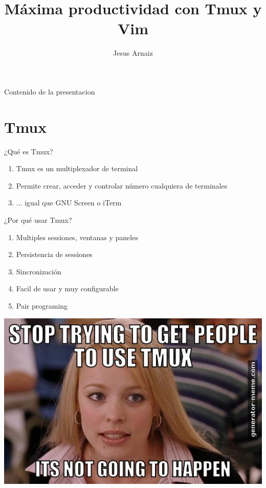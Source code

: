\documentclass{beamer}
\title{Máxima productividad con Tmux y Vim}
\subtitle{}
\author{Jesus Arnaiz}
\begin{document}
\begin{frame}
  \maketitle
\end{frame}

\begin{frame}{Contenido de la presentacion}
  \tableofcontents
\end{frame}

\section{Tmux}
\begin{frame}{¿Qué es Tmux?}
  \begin{enumerate}
  \item Tmux es un multiplexador de terminal
  \item Permite crear, acceder y controlar número cualquiera de terminales
  \item ... igual que GNU Screen o iTerm
  \end{enumerate}
\end{frame}

\begin{frame}{¿Por qué usar Tmux?}
  \begin{enumerate}
  \item Multiples sessiones, ventanas y paneles
  \item Persistencia de sessiones
  \item Sincronización
  \item Facil de usar y muy configurable
  \item Pair programing
  \end{enumerate}
\end{frame}
\begin{frame}
    \begin{center}
    \includegraphics[width=\paperwidth]{whytmux}
    \end{center}
\end{frame}
\end{document}
